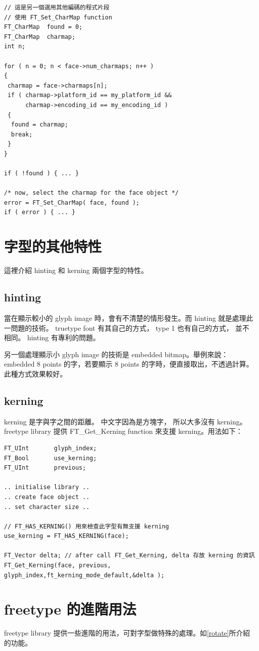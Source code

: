 \documentclass[12pt,a4]{article}
\begin{document}
\begin{CJK}{UTF8}{bsmi}
\begin{Verbatim}[commandchars=@\$?]
// 這是另一個選用其他編碼的程式片段
// 使用 FT_Set_CharMap function
FT_CharMap  found = 0;
FT_CharMap  charmap;
int n;

for ( n = 0; n < face->num_charmaps; n++ )
{
 charmap = face->charmaps[n];
 if ( charmap->platform_id == my_platform_id &&
      charmap->encoding_id == my_encoding_id )
 {
  found = charmap;
  break;
 }
}

if ( !found ) { ... }

/* now, select the charmap for the face object */
error = FT_Set_CharMap( face, found );
if ( error ) { ... }
\end{Verbatim}
\newpage
\section{字型的其他特性}
這裡介紹 hinting 和 kerning 兩個字型的特性。
\subsection{hinting}
當在顯示較小的 glyph image 時，會有不清楚的情形發生。而 hinting
就是處理此一問題的技術。 truetype font 有其自己的方式， type 1 也有自己的方式，
並不相同。 hinting 有專利的問題。

另一個處理顯示小 glyph image 的技術是 embedded bitmap。舉例來說： embedded 8 points
的字，若要顯示 8 points 的字時，便直接取出，不透過計算。此種方式效果較好。
\subsection{kerning}
kerning 是字與字之間的距離。 中文字因為是方塊字， 所以大多沒有 kerning。
freetype library 提供 FT\_{}Get\_{}Kerning function
來支援 kerning。用法如下：
\begin{Verbatim}[commandchars=@\$?]
FT_UInt       glyph_index;
FT_Bool       use_kerning;
FT_UInt       previous;

.. initialise library ..
.. create face object ..
.. set character size ..

// FT_HAS_KERNING() 用來檢查此字型有無支援 kerning
use_kerning = FT_HAS_KERNING(face);

FT_Vector delta; // after call FT_Get_Kerning, delta 存放 kerning 的資訊
FT_Get_Kerning(face, previous, glyph_index,ft_kerning_mode_default,&delta );
\end{Verbatim}
\newpage
\section{freetype 的進階用法}
freetype library 提供一些進階的用法，可對字型做特殊的處理。如\ref{rotate}所介紹的功能。

\end{CJK}
\end{document}
